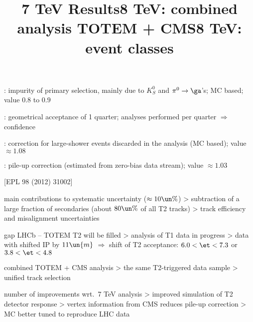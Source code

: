 \> : impurity of primary selection, mainly due to $K_S^0$ and $\pi^0\rightarrow \ga$'s; MC based; value $0.8$ to $0.9$

\> \Em{$2\pi/\Ph$}: geometrical acceptance of 1 quarter; analyses performed per quarter $\Rightarrow$ confidence

\> : correction for large-shower events discarded in the analysis (MC based); value $\approx 1.08$

\> : pile-up correction (estimated from zero-bias data stream); value $\approx 1.03$

\newpage %
\title{7 TeV Results}

\centerline{[EPL 98 (2012) 31002]}

\> main contributions to systematic uncertainty ($\approx 10\un{\%}$)
\>> subtraction of a large fraction of secondaries (about $80\un{\%}$ of all T2 tracks)
\>> track efficiency and misalignment uncertainties



\> gap LHCb -- TOTEM T2 will be filled
\>> analysis of T1 data in progress
\>> data with shifted IP by $11\un{m}$ $\Rightarrow$ shift of T2 acceptance: $6.0 < \et < 7.3$ or  $3.8 < \et < 4.8$


\newpage %
\title{8 TeV: combined analysis TOTEM + CMS}

\vskip-3mm

\> combined TOTEM + CMS analysis
\>> the same T2-triggered data sample
\>> unified track selection

\> number of improvements wrt.~7 TeV analysis
\>> improved simulation of T2 detector response
\>> vertex information from CMS reduces pile-up correction
\>> MC better tuned to reproduce LHC data

\vfil
{}

\newpage %
\title{8 TeV: event classes}

